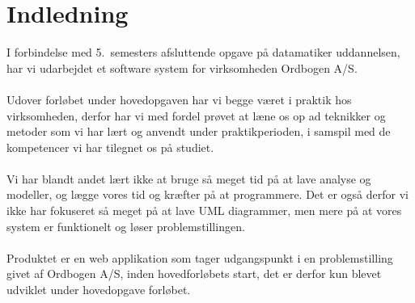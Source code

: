 \section{Indledning}
I forbindelse med 5.\ semesters afsluttende opgave på datamatiker uddannelsen, har vi udarbejdet et software system for virksomheden Ordbogen A/S.
\\\\
Udover forløbet under hovedopgaven har vi begge været i praktik hos virksomheden, derfor har vi med fordel prøvet at læne os op ad teknikker og metoder
som vi har lært og anvendt under praktikperioden, i samspil med de kompetencer vi har tilegnet os på studiet.
\\\\
Vi har blandt andet lært ikke at bruge så meget tid på at lave analyse og modeller, og lægge vores tid og kræfter på at programmere.
Det er også derfor vi ikke har fokuseret så meget på at lave UML diagrammer, men mere på at vores system er funktionelt og løser problemstillingen.
\\\\
Produktet er en web applikation som tager udgangspunkt i en problemstilling givet af Ordbogen A/S, inden hovedforløbets start, det er derfor kun blevet udviklet under
hovedopgave forløbet.
